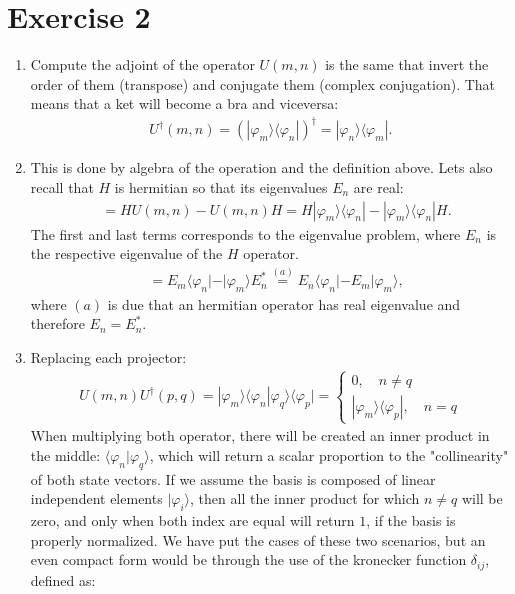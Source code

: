 \documentclass[letterpaper,11pt,twoside]{article}
\begin{document}
\section{Exercise 2}
\begin{enumerate}[itemsep=0pt,topsep=0pt,label=\alph*.]
  \item Compute the adjoint of the operator $U(m,n)$ is the same that invert the order of them (transpose) and conjugate them (complex conjugation).
  That means that a ket will become a bra and viceversa: 
  \begin{align*}
    U^\dagger(m,n)=(|\varphi_m\rangle\langle\varphi_n|)^\dagger=|\varphi_n\rangle\langle \varphi_m|.
  \end{align*}
  \item This is done by algebra of the operation and the definition above. Lets also
  recall that $H$ is hermitian so that its eigenvalues $E_n$ are real:
  \begin{align*}
    [H,U(m,n)]&=HU(m,n)-U(m,n)H=H|\varphi_m\rangle\langle\varphi_n|-|\varphi_m\rangle\langle\varphi_n|H.
  \end{align*}
  The first and last terms corresponds to the eigenvalue problem, where $E_n$ is the respective eigenvalue of the $H$ operator.
  \begin{align*}
    [H,U(m,n)]&=E_m\langle\varphi_n|-|\varphi_m\rangle E_n^*\stackrel{(a)}{=}E_n\langle\varphi_n|-E_m|\varphi_m\rangle,
  \end{align*}
  where $(a)$ is due that an hermitian operator has real eigenvalue and therefore $E_n=E_n^*$.
  \item Replacing each projector:
  \begin{align*}
    U(m,n)U^\dagger (p,q)=|\varphi_m\rangle\langle\varphi_n|\varphi_q\rangle\langle\varphi_p|=\begin{cases}
      0,\quad n\neq q\\
      |\varphi_m\rangle\langle\varphi_p|,\quad n=q
    \end{cases}
  \end{align*}
  When multiplying both operator, there will be created an inner product in the middle: $\langle\varphi_n|\varphi_q\rangle$, which 
  will return a scalar proportion to the "collinearity" of both state vectors. If we assume the basis is composed of linear independent elements $|\varphi_i\rangle$,
  then all the inner product for which $n\neq q$ will be zero, and only when both index are equal will return $1$, if the basis is properly normalized.
  We have put the cases of these two scenarios, but an even compact form would be through the use of the kronecker function $\delta_{ij}$, defined as:

\end{enumerate}
\end{document}

